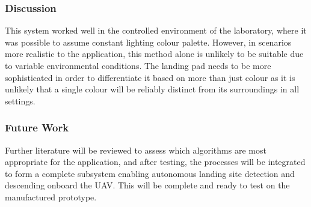 \subsubsection{Discussion}
This system worked well in the controlled environment of the laboratory, where it was possible to assume constant lighting colour palette. However, in scenarios more realistic to the application, this method alone is unlikely to be suitable due to variable environmental conditions. The landing pad needs to be more sophisticated in order to differentiate it based on more than just colour as it is unlikely that a single colour will be reliably distinct from its surroundings in all settings.


\subsubsection{Future Work}

Further literature will be reviewed to assess which algorithms are most appropriate for the application, and after testing, the processes will be integrated to form a complete subsystem enabling autonomous landing site detection and descending onboard the UAV. This will be complete and ready to test on the manufactured prototype.